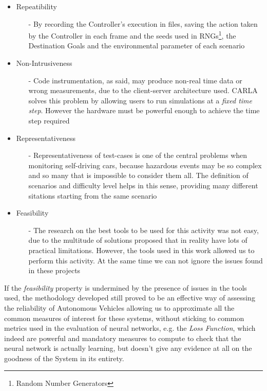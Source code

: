 \begin{itemize}
	\item Repeatibility
	\begin{itemize}
		\item[-] By recording the Controller's execution in files, saving the action taken by the Controller in each frame and the seeds used in RNGs\footnote{Random Number Generators}, the Destination Goals and the environmental parameter of each scenario
	\end{itemize}
	\item Non-Intrusiveness
	\begin{itemize}
		\item[-] Code instrumentation, as said, may produce non-real time data or wrong measurements, due to the client-server architecture used. CARLA solves this problem by allowing users to run simulations at a \textsl{fixed time step}. However the hardware must be powerful enough to achieve the time step required
	\end{itemize}
	\item Representativeness
	\begin{itemize}
		\item[-] Representativeness of test-cases is one of the central problems when monitoring self-driving cars, because hazardous events may be so complex and so many that is impossible to consider them all. The definition of scenarios and difficulty level helps in this sense, providing many different sitations starting from the same scenario
	\end{itemize}
	\item Feasibility
	\begin{itemize}
		\item[-] The research on the best tools to be used for this activity was not easy, due to the multitude of solutions proposed that in reality have lots of practical limitations. However, the tools used in this work allowed us to perform this activity. At the same time we can not ignore the issues found in these projects
	\end{itemize}
\end{itemize}

If the \textsl{feasibility} property is undermined by the presence of issues in the tools used, the methodology developed still proved to be an effective way of assessing the reliability of Autonomous Vehicles allowing us to approximate all the common measures of interest for these systems, without sticking to common metrics used in the evaluation of neural networks, e.g. the \textsl{Loss Function}, which indeed are powerful and mandatory measures to compute to check that the neural network is actually learning, but doesn't give any evidence at all on the goodness of the System in its entirety.\newline

